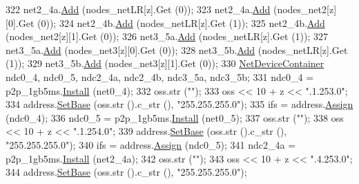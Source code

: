 \begin{DoxyCode}
322       net2\_4a.\hyperlink{classns3_1_1NodeContainer_aa60b3a0e70f2fb324e16ffcf8bf31fcb}{Add} (nodes\_netLR[z].Get (0));
323       net2\_4a.\hyperlink{classns3_1_1NodeContainer_aa60b3a0e70f2fb324e16ffcf8bf31fcb}{Add} (nodes\_net2[z][0].Get (0));
324       net2\_4b.\hyperlink{classns3_1_1NodeContainer_aa60b3a0e70f2fb324e16ffcf8bf31fcb}{Add} (nodes\_netLR[z].Get (1));
325       net2\_4b.\hyperlink{classns3_1_1NodeContainer_aa60b3a0e70f2fb324e16ffcf8bf31fcb}{Add} (nodes\_net2[z][1].Get (0));
326       net3\_5a.\hyperlink{classns3_1_1NodeContainer_aa60b3a0e70f2fb324e16ffcf8bf31fcb}{Add} (nodes\_netLR[z].Get (1));
327       net3\_5a.\hyperlink{classns3_1_1NodeContainer_aa60b3a0e70f2fb324e16ffcf8bf31fcb}{Add} (nodes\_net3[z][0].Get (0));
328       net3\_5b.\hyperlink{classns3_1_1NodeContainer_aa60b3a0e70f2fb324e16ffcf8bf31fcb}{Add} (nodes\_netLR[z].Get (1));
329       net3\_5b.\hyperlink{classns3_1_1NodeContainer_aa60b3a0e70f2fb324e16ffcf8bf31fcb}{Add} (nodes\_net3[z][1].Get (0));
330       \hyperlink{classns3_1_1NetDeviceContainer}{NetDeviceContainer} ndc0\_4, ndc0\_5, ndc2\_4a, ndc2\_4b, ndc3\_5a, ndc3\_5b;
331       ndc0\_4 = p2p\_1gb5ms.\hyperlink{classns3_1_1PointToPointHelper_ab9162fea3e88722666fed1106df1f9ec}{Install} (net0\_4);
332       oss.str (\textcolor{stringliteral}{""});
333       oss << 10 + z << \textcolor{stringliteral}{".1.253.0"};
334       address.\hyperlink{classns3_1_1Ipv4AddressHelper_acf7b16dd25bac67e00f5e25f90a9a035}{SetBase} (oss.str ().c\_str (), \textcolor{stringliteral}{"255.255.255.0"});
335       ifs = address.\hyperlink{classns3_1_1Ipv4AddressHelper_af8e7f4a1a7e74c00014a1eac445a27af}{Assign} (ndc0\_4);
336       ndc0\_5 = p2p\_1gb5ms.\hyperlink{classns3_1_1PointToPointHelper_ab9162fea3e88722666fed1106df1f9ec}{Install} (net0\_5);
337       oss.str (\textcolor{stringliteral}{""});
338       oss << 10 + z << \textcolor{stringliteral}{".1.254.0"};
339       address.\hyperlink{classns3_1_1Ipv4AddressHelper_acf7b16dd25bac67e00f5e25f90a9a035}{SetBase} (oss.str ().c\_str (), \textcolor{stringliteral}{"255.255.255.0"});
340       ifs = address.\hyperlink{classns3_1_1Ipv4AddressHelper_af8e7f4a1a7e74c00014a1eac445a27af}{Assign} (ndc0\_5);
341       ndc2\_4a = p2p\_1gb5ms.\hyperlink{classns3_1_1PointToPointHelper_ab9162fea3e88722666fed1106df1f9ec}{Install} (net2\_4a);
342       oss.str (\textcolor{stringliteral}{""});
343       oss << 10 + z << \textcolor{stringliteral}{".4.253.0"};
344       address.\hyperlink{classns3_1_1Ipv4AddressHelper_acf7b16dd25bac67e00f5e25f90a9a035}{SetBase} (oss.str ().c\_str (), \textcolor{stringliteral}{"255.255.255.0"});

\end{DoxyCode}
